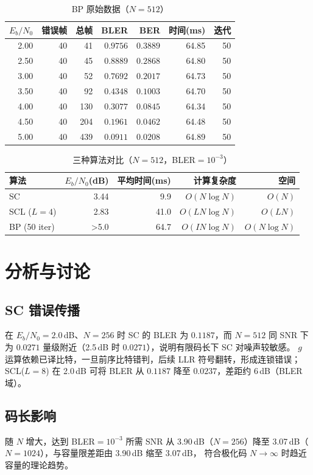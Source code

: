 \documentclass[12pt, a4paper]{article}
\begin{document}
\begin{table}[H]
\centering\caption{BP 原始数据（$N=512$）}
\begin{tabular}{rrrrrrr}
\toprule
$E_b/N_0$ & 错误帧 & 总帧 & BLER & BER & 时间(ms) & 迭代 \\
\midrule
2.00 & 40 & 41 & $0.9756$ & $0.3889$ & 64.85 & 50 \\
2.50 & 40 & 45 & $0.8889$ & $0.2868$ & 64.80 & 50 \\
3.00 & 40 & 52 & $0.7692$ & $0.2017$ & 64.73 & 50 \\
3.50 & 40 & 92 & $0.4348$ & $0.1003$ & 64.70 & 50 \\
4.00 & 40 & 130 & $0.3077$ & $0.0845$ & 64.34 & 50 \\
4.50 & 40 & 204 & $0.1961$ & $0.0462$ & 64.48 & 50 \\
5.00 & 40 & 439 & $0.0911$ & $0.0208$ & 64.89 & 50 \\
\bottomrule
\end{tabular}
\end{table}

\begin{table}[H]
\centering
\caption{三种算法对比（$N=512$，BLER$=10^{-3}$）}
\begin{tabular}{lrrrr}
\toprule
算法 & $E_b/N_0$(dB) & 平均时间(ms) & 计算复杂度 & 空间 \\
\midrule
SC & 3.44 & 9.9 & $O(N\log N)$ & $O(N)$ \\
SCL ($L=4$) & 2.83 & 41.0 & $O(LN\log N)$ & $O(LN)$ \\
BP (50 iter) & >5.0 & 64.7 & $O(IN\log N)$ & $O(N\log N)$ \\
\bottomrule
\end{tabular}
\end{table}

\section{分析与讨论}

\subsection{SC 错误传播}
在 $E_b/N_0=2.0$\,dB、$N=256$ 时 SC 的 BLER 为 $0.1187$，而 $N=512$ 同 SNR 下为
$0.0271$ 量级附近（2.5\,dB 时 $0.0271$），说明有限码长下 SC 对噪声较敏感。
$g$ 运算依赖已译比特，一旦前序比特错判，后续 LLR 符号翻转，形成连锁错误；
SCL($L=8$) 在 2.0\,dB 可将 BLER 从 $0.1187$ 降至 $0.0237$，差距约 6\,dB（BLER 域）。

\subsection{码长影响}
随 $N$ 增大，达到 BLER$=10^{-3}$ 所需 SNR 从 3.90\,dB（$N=256$）降至
3.07\,dB（$N=1024$），与容量限差距由 3.90\,dB 缩至 3.07\,dB，
符合极化码 $N\to\infty$ 时趋近容量的理论趋势。
\end{document}
